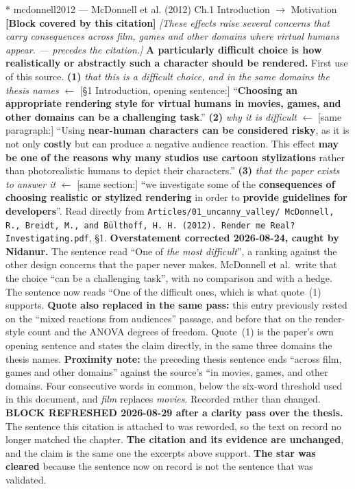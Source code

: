 \documentclass[11pt, a4paper]{article}
\makeatletter
\newcounter{citentry}
\newcommand{\citentry@core}[7]{%
  \stepcounter{citentry}
  \begingroup
  \sbox{\citentry@measurebox}{%
    \begin{minipage}{\linewidth}
      \noindent\colorbox{konstanzblue}{\parbox{\dimexpr\linewidth-2\fboxsep}{%
        \vspace{3pt}
        \textbf{\#\thecitentry \quad #2} \hfill \textit{#3}
        \vspace{3pt}
      }}
      \vspace{3pt}
      \noindent\begin{tabular}{@{}p{2.7cm} p{\dimexpr\linewidth-3cm}@{}}
        \textit{\small Sentence in thesis:} & #4 \\[5pt]
        \textbf{Usage:}\hfill       & #5 \\[5pt]
        \textit{\small Original source:}     & #6 \\[5pt]
        \textbf{How to check:}             & #7 \\
      \end{tabular}
      \vspace{5pt}
      \rule{10pt}{10pt}\quad \textbf{Validated} --- I have read the original and agree it supports the sentence.
    \end{minipage}%
  }%
  \Needspace{\dimexpr\ht\citentry@measurebox+\dp\citentry@measurebox\relax}%
  \endgroup
  \vspace{10pt}
  \noindent\colorbox{konstanzblue}{\parbox{\dimexpr\linewidth-2\fboxsep}{%
    \vspace{3pt}
    \textcolor{white}{\textbf{\#\thecitentry \quad #2}} \hfill \textcolor{white}{\textit{#3}}
    \vspace{3pt}
  }}
  \vspace{3pt}
  \noindent\begin{tabular}{@{}p{2.7cm} p{\dimexpr\linewidth-3cm}@{}}
    \textit{\small Sentence in thesis:} & \textcolor{darkgreen}{#4} \\[5pt]
    \textbf{Usage:}\hfill       & #5 \\[5pt]
    \textit{\small Original source:}     & \textcolor{darkred}{#6} \\[5pt]
    \textbf{How to check:}             & #7 \\
  \end{tabular}
  \vspace{5pt}
  \noindent\CheckBox[name=verified\thecitentry, width=10pt, height=10pt, bordercolor={0 0 0}, borderwidth=0.75, backgroundcolor={1 1 1}#1]{}\quad \textbf{Validated} --- I have read the original and agree it supports the sentence.
  \vspace{3pt}
  \noindent\textcolor{midgray}{\rule{\linewidth}{0.4pt}}
}
\newcommand{\citentry}{\@ifstar{\citentry@core{, checked}}{\citentry@core{}}}
\makeatother
\begin{document}
\begin{Form}
\citentry*
  {mcdonnell2012 --- McDonnell et al. (2012)}
  {Ch.1 Introduction $\rightarrow$ Motivation}
  {\textbf{[Block covered by this citation]} \emph{[These effects raise several concerns that carry consequences across film, games and other domains where virtual humans appear. --- precedes the citation.]} \textbf{A particularly difficult choice is how realistically or abstractly such a character should be rendered.}}
  {First use of this source.}
  {\textbf{(1)} \emph{that this is a difficult choice, and in the same domains the thesis names} $\leftarrow$ [\S1 Introduction, opening sentence:] ``\textbf{Choosing an appropriate rendering style for virtual humans in movies, games, and other domains can be a challenging task}.'' \quad \textbf{(2)} \emph{why it is difficult} $\leftarrow$ [same paragraph:] ``Using \textbf{near-human characters can be considered risky}, as it is not only \textbf{costly} but can produce a negative audience reaction. This effect \textbf{may be one of the reasons why many studios use cartoon stylizations} rather than photorealistic humans to depict their characters.'' \quad \textbf{(3)} \emph{that the paper exists to answer it} $\leftarrow$ [same section:] ``we investigate some of the \textbf{consequences of choosing realistic or stylized rendering} in order to \textbf{provide guidelines for developers}''.}
  {Read directly from \texttt{\footnotesize Articles/01\_uncanny\_valley/ McDonnell, R., Breidt, M., and B\"ulthoff, H. H. (2012). Render me Real? Investigating.pdf}, \S1. \textbf{Overstatement corrected 2026-08-24, caught by Nidanur.} The sentence read ``One of \emph{the most difficult}'', a ranking against the other design concerns that the paper never makes. McDonnell et al.\ write that the choice ``can be a challenging task'', with no comparison and with a hedge. The sentence now reads ``One of the difficult ones, which is what quote~(1) supports. \textbf{Quote also replaced in the same pass:} this entry previously rested on the ``mixed reactions from audiences'' passage, and before that on the render-style count and the ANOVA degrees of freedom. Quote~(1) is the paper's own opening sentence and states the claim directly, in the same three domains the thesis names. \textbf{Proximity note:} the preceding thesis sentence ends ``across film, games and other domains'' against the source's ``in movies, games, and other domains. Four consecutive words in common, below the six-word threshold used in this document, and \emph{film} replaces \emph{movies}. Recorded rather than changed. \textbf{BLOCK REFRESHED 2026-08-29 after a clarity pass over the thesis.} The sentence this citation is attached to was reworded, so the text on record no longer matched the chapter. \textbf{The citation and its evidence are unchanged}, and the claim is the same one the excerpts above support. \textbf{The star was cleared} because the sentence now on record is not the sentence that was validated.}



\end{Form}
\end{document}
